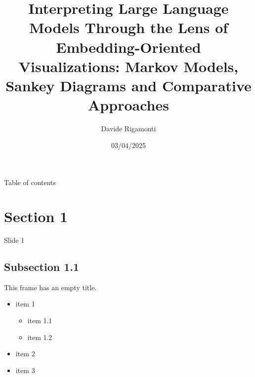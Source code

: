 \documentclass[aspectratio=169]{beamer}
\title{Interpreting Large Language Models Through the Lens of \\ Embedding-Oriented Visualizations: Markov Models, \\ Sankey Diagrams and Comparative Approaches}
\author{Davide Rigamonti}
\date{03/04/2025}
\begin{document}
    \begin{frame}
        \maketitle
    \end{frame}
    
    \begin{frame}{Table of contents}
      \tableofcontents
    \end{frame}
    
    \section{Section 1}
    \begin{frame}[plain]{}
        \sectionpage
    \end{frame}
    
    \begin{frame}{Slide 1}
        \lipsum[1]
    \end{frame}
    
    \subsection{Subsection 1.1}
    \begin{frame}[plain]{}
        \subsectionpage
    \end{frame}
    \begin{frame}
        This frame has an empty title.
        \vfill
        \begin{itemize}
            \item item 1
            \begin{itemize}
                \item item 1.1
                \item item 1.2
            \end{itemize}
            \item item 2
            \item item 3
        \end{itemize}
    \end{frame}
    
\end{document}
